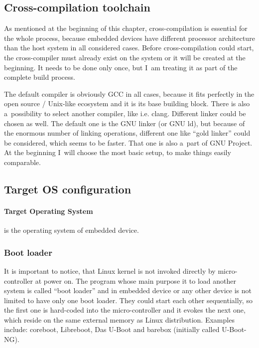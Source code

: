 \documentclass[printmode]{mgr}
\begin{document}
\subsection*{Cross-compilation toolchain}

As mentioned at the beginning of this chapter, cross-compilation is essential for the whole process, because embedded devices have different processor architecture than the host system in all considered cases. Before cross-compilation could start, the cross-compiler must already exist on the system or it will be created at the beginning. It needs to be done only once, but I~am treating it as part of the complete build process.

The default compiler is obviously GCC in all cases, because it fits perfectly in the open source / Unix-like ecosystem and it is its base building block. There is also a~possibility to select another compiler, like i.e. clang. Different linker could be chosen as well. The default one is the GNU linker (or GNU ld), but because of the enormous number of linking operations, different one like ``gold linker'' could be considered, which seems to be faster. That one is also a~part of GNU Project. At the beginning I~will choose the most basic setup, to make things easily comparable. 


\subsection*{Target OS configuration}

\paragraph{Target Operating System} is the operating system of embedded device.

\subsubsection{Boot loader}
It is important to notice, that Linux kernel is not invoked directly by micro-controller at power on. The program whose main purpose it to load another system is called ``boot loader'' and in embedded device or any other device is not limited to have only one boot loader. They could start each other sequentially, so the first one is hard-coded into the micro-controller and it evokes the next one, which reside on the same external memory as Linux distribution. Examples include: coreboot, Libreboot, Das U-Boot and barebox (initially called U-Boot-NG).
\end{document}
